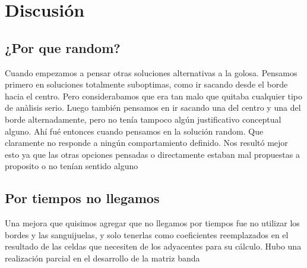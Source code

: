 \section{Discusi\'on}


\subsection{¿Por que random?}

Cuando empezamos a pensar otras soluciones alternativas a la golosa. Pensamos primero en soluciones totalmente suboptimas, como ir sacando desde el borde hacia el centro. Pero considerabamos que era tan malo que quitaba cualquier tipo de anàlisis serio. Luego también pensamos en ir sacando una del centro y una del borde alternadamente, pero no tenía tampoco algún justificativo conceptual alguno. Ahí fué entonces cuando pensamos en la solución random. Que claramente no responde a ningún compartamiento definido. Nos resultó mejor esto ya que las otras opciones pensadas o directamente estaban mal propuestas a proposito o no tenían sentido alguno


\subsection{Por tiempos no llegamos}
  Una mejora que quisimos agregar que no llegamos por tiempos fue no utilizar los bordes y las sanguijuelas, y solo tenerlas como coeficientes reemplazados en el resultado de las celdas que necesiten de los adyacentes para su cálculo. Hubo una realización parcial en el desarrollo de la matriz banda










